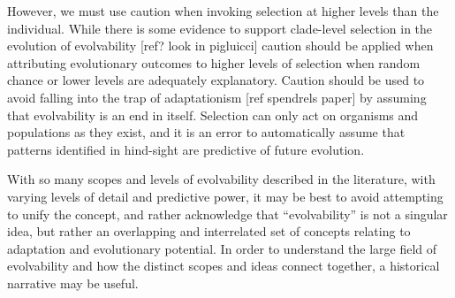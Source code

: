 However, we must use caution when invoking selection at higher levels than the individual. While there is some evidence to support clade-level selection in the evolution of evolvability [ref? look in pigluicci] caution should be applied when attributing evolutionary outcomes to higher levels of selection when random chance or  lower levels are adequately explanatory. Caution should be used to avoid falling into the trap of adaptationism [ref spendrels paper] by assuming that evolvability is an end in itself. Selection can only act on organisms and populations as they exist, and it is an error to automatically assume that patterns identified in hind-sight are predictive of future evolution.

With so many scopes and levels of evolvability described in the literature, with varying levels of detail and predictive power, it may be best to avoid attempting to unify the concept, and rather acknowledge that “evolvability” is not a singular idea, but rather an overlapping and interrelated set of concepts relating to adaptation and evolutionary potential. In order to understand the large field of evolvability and how the distinct scopes and ideas connect together, a historical narrative may be useful.

